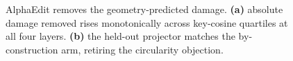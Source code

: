 \begin{figure}[t]
\centering

\caption{AlphaEdit removes the geometry-predicted damage. \textbf{(a)} absolute damage
removed rises monotonically across key-cosine quartiles at all four layers.
\textbf{(b)} the held-out projector matches the by-construction arm, retiring the
circularity objection.}
\label{fig:causal}
\end{figure}
